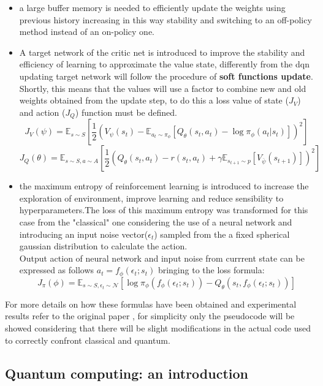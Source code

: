 \begin{itemize}
	\item a large buffer memory is needed to efficiently update the weights using previous history increasing in this way stability and switching to an off-policy method instead of an on-policy one.
	\item A target network of the critic net is introduced to improve the stability and efficiency of learning to approximate the value state, differently from the \acrshort{dqn} updating target network will follow the procedure of \textbf{soft functions update}. Shortly, this means that the values will use a factor to combine new and old weights obtained from the update step, to do this a loss value of state ($J_{V}$) and action ($J_{Q}$) function must be defined.
	\begin{equation}\label{state of calue loss}
		J_{V}(\psi)= \mathbb{E}_{s \sim S}\left[ \frac{1}{2} (V_\psi(s_t) - \mathbb{E}_{a_t \sim \pi_\phi}[Q_\theta(s_t,a_t) - \log \pi_{\phi}(a_t|s_t)])^2 \right]
	\end{equation}
	\begin{equation}\label{state of action loss}
		J_{Q}(\theta)= \mathbb{E}_{s \sim S, a \sim A }\left[\frac{1}{2}(Q_\theta(s_t,a_t) - r(s_t,a_t) + \gamma \mathbb{E}_{s_{t+1} \sim p}[V_{\overline{\psi}}(s_{t+1})] )^2 \right]
	\end{equation}
	\item the maximum entropy of reinforcement learning is introduced to increase the exploration of environment, improve learning and reduce sensibility to hyperparameters.The loss of this maximum entropy was transformed for this case from the "classical" one considering the use of a neural network and introducing an input noise vector($\epsilon_t$) sampled from the a fixed spherical gaussian distribution to calculate the action.\\
	Output action of neural network and input noise from currrent state can be expressed as follows $a_t = f_\phi(\epsilon_t;s_t)$ bringing to the loss formula:
	\begin{equation}\label{policy loss}
		J_{\pi}(\phi)= \mathbb{E}_{s \sim S, \epsilon_t \sim \mathcal{N}}\left[ \log \pi_{\phi}(f_\phi(\epsilon_t;s_t)) - Q_{\theta}(s_t, f_\phi(\epsilon_t;s_t))\right]
	\end{equation}
\end{itemize}
For more details on how these formulas have been obtained and experimental results refer to the original paper \cite{DBLP:journals/corr/abs-1801-01290}, for simplicity only the pseudocode will be showed considering that there will be slight modifications in the actual code used to correctly confront classical and quantum.
\subsection{Quantum computing: an introduction}

